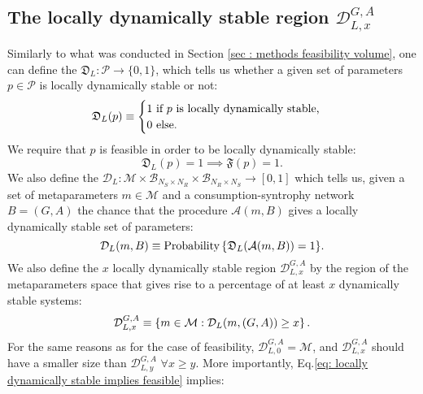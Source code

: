 \documentclass[12pt, titlepage]{report}
\begin{document}
\subsection{The locally dynamically stable region \texorpdfstring{$\mathcal{D}^{G,A}_{L,x}$}{DLx}} \label{sec: dynamical stability methods locally dynamically stable region}
Similarly to what was conducted in Section \ref{sec : methods feasibility volume}, one can define the  $\mathfrak{D}_L: \mathcal{P} \rightarrow \{
0,1\}$, which tells us whether a given set of parameters $p \in \mathcal{P}$ is locally dynamically stable or not:
\begin{equation}
\mathfrak{D}_L(p)\equiv\begin{cases}
1 \text{ if } p \text{ is locally dynamically stable,} \\
0 \text{ else.}
\end{cases}
\end{equation}
We require that $p$ is feasible in order to be locally dynamically stable:
\begin{equation}
\mathfrak{D}_L(p)=1 \implies \mathfrak{F}(p)=1. \label{eq: locally dynamically stable implies feasible}
\end{equation}
We also define the  $\mathcal{D}_L: \mathcal{M} \times \mathcal{B}_{N_S \times N_R} \times \mathcal{B}_{N_R \times N_S} \rightarrow [0,1]$ which tells us, given a set of metaparameters $m \in \mathcal{M}$ and a consumption-syntrophy network $B=(G,A)$ the chance that the procedure $\mathcal{A}(m,B)$ gives a locally dynamically stable set of parameters:
\begin{equation}
{\mathcal{D}_L(m, B)\equiv\text{Probability}\left\{\mathfrak{D}_L(\mathcal{A}(m, B))=1\right\}}. \label{eq : dyn stab methods dynamical stability function}
\end{equation}
We also define the $x$ locally dynamically stable region $\mathcal{D}_{L,x}^{G,A}$ by the region of the metaparameters space that gives rise to a percentage of at least $x$ dynamically stable systems:
\begin{equation}
\mathcal{D}_{L,x}^{G,A} \equiv \left\{m \in \mathcal{M}: \mathcal{D}_L(m, (G,A)) \geq x \right\}.
\end{equation}
For the same reasons as for the case of feasibility, $\mathcal{D}_{L,0}^{G,A}=\mathcal{M}$, and $\mathcal{D}_{L,x}^{G,A}$ should have a smaller size than $\mathcal{D}_{L,y}^{G,A}$ $\forall x \geq y$. More importantly, Eq.\eqref{eq: locally dynamically stable implies feasible} implies:
\end{document}
